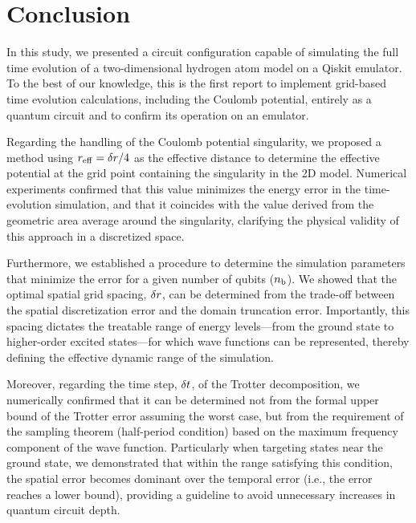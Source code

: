 \documentclass[aip, adv, amsmath, amssymb, reprint]{revtex4-1}
\begin{document}

\section{Conclusion}
In this study, we presented a circuit configuration capable of simulating the
full time evolution of a two-dimensional hydrogen atom model on a Qiskit
emulator. To the best of our knowledge, this is the first report to implement
grid-based time evolution calculations, including the Coulomb potential,
entirely as a quantum circuit and to confirm its operation on an emulator.

Regarding the handling of the Coulomb potential singularity, we proposed a
method using $r_{\mathrm{eff}}=\delta r/4$ as the effective distance to determine the
effective potential at the grid point containing the singularity in the 2D
model. Numerical experiments confirmed that this value minimizes the
energy error in the time-evolution simulation, and that it coincides with
the value derived from the geometric area average around the singularity,
clarifying the physical validity of this approach in a discretized space.

Furthermore, we established a procedure to determine the simulation parameters
that minimize the error for a given number of qubits ($n_{\mathrm{b}}$). We showed that the
optimal spatial grid spacing, $\delta r$, can be determined from the trade-off
between the spatial discretization error and the domain truncation error.
Importantly, this spacing dictates the treatable range of
energy levels---from the ground state to higher-order excited states---for which
wave functions can be represented, thereby defining the effective dynamic range
of the simulation.

Moreover, regarding the time step, $\delta t$, of the Trotter decomposition, we
numerically confirmed that it can be determined not from the formal upper bound
of the Trotter error assuming the worst case, but from the requirement of the
sampling theorem (half-period condition) based on the maximum frequency
component of the wave function. Particularly when targeting states near the
ground state, we demonstrated that within the range satisfying this condition,
the spatial error becomes dominant over the temporal error (i.e., the error
reaches a lower bound), providing a guideline to avoid unnecessary increases in
quantum circuit depth.
\end{document}
